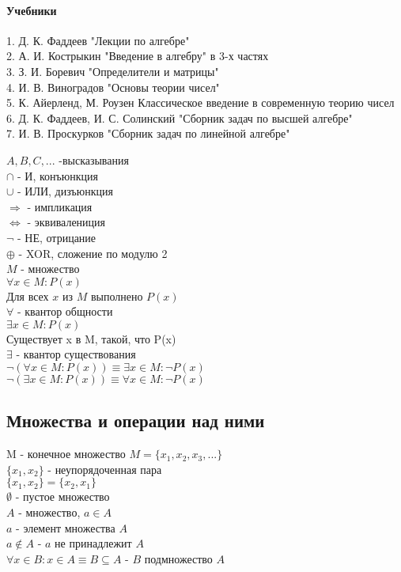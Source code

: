 \paragraph{Учебники} 

1. Д. К. Фаддеев "Лекции по алгебре" \\
2. А. И. Кострыкин "Введение в алгебру" в 3-х частях \\
3. З. И. Боревич "Определители и матрицы" \\
4. И. В. Виноградов "Основы теории чисел" \\
5. К. Айерленд, М. Роузен Классическое введение в современную теорию чисел \\
6. Д. К. Фаддеев, И. С. Солинский "Сборник задач по высшей алгебре" \\
7. И. В. Проскурков "Сборник задач по линейной алгебре"



$ A, B, C, ... $ -высказывания \\
$ \cap $ - И, конъюнкция \\
$ \cup $ - ИЛИ, дизъюнкция \\
$ \Rightarrow $ - импликация \\
$ \Leftrightarrow $ - эквивалениция \\
$ \neg $ - НЕ, отрицание \\
$ \oplus $ - XOR, сложение по модулю 2 \\

$ M $ - множество \\
$ \forall x \in M: P(x) $ \\
Для всех $x$ из $M$ выполнено $P(x)$ \\
$ \forall $ - квантор общности \\
$ \exists x \in M:  P(x) $ \\
Существует x в M, такой, что P(x) \\
$ \exists $ - квантор существования \\
$ \neg (\forall x \in M: P(x)) \equiv \exists x \in M: \neg P(x) $ \\
$ \neg ( \exists x \in M: P(x)) \equiv \forall x \in M: \neg P(x) $ \\

\subsection{Множества и операции над ними}
M - конечное множество
$ M = \{ x_1, x_2, x_3, ...\} $ \\
$ \{x_1, x_2\} $ - неупорядоченная пара \\
$ \{x_1, x_2 \} = \{x_2, x_1 \} $ \\
$ \emptyset $ - пустое множество \\
$ A $ - множество, $ a \in A $ \\
$ a $ - элемент множества $ A $ \\
$ a \notin A $ - $a$ не принадлежит $A$ \\
$ \forall x \in B: x \in A  \equiv B \subseteq A $ - $B$ подмножество $A$ \\

